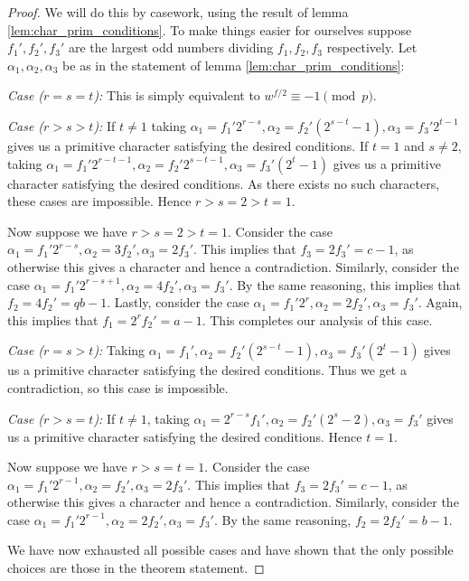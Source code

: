 \documentclass{article}
\theoremstyle{definition}
\theoremstyle{definition}
\theoremstyle{remark}
\begin{document}
\begin{proof} 
We will do this by casework, using the result of lemma \ref{lem:char_prim_conditions}. To make things easier for ourselves suppose $f_1', f_2', f_3'$ are the largest odd numbers dividing $f_1, f_2, f_3$ respectively. Let $\alpha_1, \alpha_2, \alpha_3$ be as in the statement of lemma \ref{lem:char_prim_conditions}:
\\
\par
\textit{Case ($r=s=t$): } This is simply equivalent to $w^{f/2} \equiv -1 \pmod{p}$.
\\
\par
\textit{Case ($r>s>t$): } If $t \neq 1$ taking $\alpha_1 = f_1'2^{r-s}, \alpha_2 = f_2'(2^{s-t}-1), \alpha_3 = f_3'2^{t-1}$ gives us a primitive character satisfying the desired conditions. If $t = 1$ and $s \neq 2$, taking $\alpha_1 = f_1'2^{r - t - 1}, \alpha_2 = f_2'2^{s-t-1}, \alpha_3 = f_3'(2^{t} - 1)$ gives us a primitive character satisfying the desired conditions. As there exists no such characters, these cases are impossible. Hence $r >s=2>t=1$. 
\par
Now suppose we have $r >s=2>t=1$. Consider the case $\alpha_1 = f_1'2^{r-s}, \alpha_2 = 3f_2', \alpha_3 = 2f_3'$. This implies that $f_3 = 2f_3' =c - 1$, as otherwise this gives a character and hence a contradiction. Similarly, consider the case $\alpha_1 = f_1'2^{r-s+1}, \alpha_2 = 4f_2', \alpha_3 = f_3'$. By the same reasoning, this implies that $f_2 = 4f_2' = qb- 1$. Lastly, consider the case $\alpha_1 = f_1'2^{r}, \alpha_2 = 2f_2', \alpha_3 = f_3'$. Again, this implies that $f_1 = 2^rf_2' = a - 1$. This completes our analysis of this case.
\\
\par
\textit{Case ($r=s>t$): } Taking $\alpha_1 = f_1', \alpha_2 = f_2'(2^{s-t}-1), \alpha_3 = f_3'(2^{t}-1)$ gives us a primitive character satisfying the desired conditions. Thus we get a contradiction, so this case is impossible.
\\
\par
\textit{Case ($r>s=t$): } If $t \neq 1$, taking $\alpha_1 =2^{r-s}f_1', \alpha_2 = f_2'(2^{s}-2), \alpha_3 = f_3'$ gives us a primitive character satisfying the desired conditions. Hence $t = 1$.
\par
Now suppose we have $r > s=t=1$. Consider the case $\alpha_1 = f_1'2^{r-1}, \alpha_2 = f_2', \alpha_3 = 2f_3'$. This implies that $f_3 = 2f_3' =c - 1$, as otherwise this gives a character and hence a contradiction. Similarly, consider the case $\alpha_1 = f_1'2^{r-1}, \alpha_2 = 2f_2', \alpha_3 = f_3'$. By the same reasoning, $f_2 = 2f_2' = b - 1$.
\\
\par
We have now exhausted all possible cases and have shown that the only possible choices are those in the theorem statement.
\end{proof}
\end{document}
